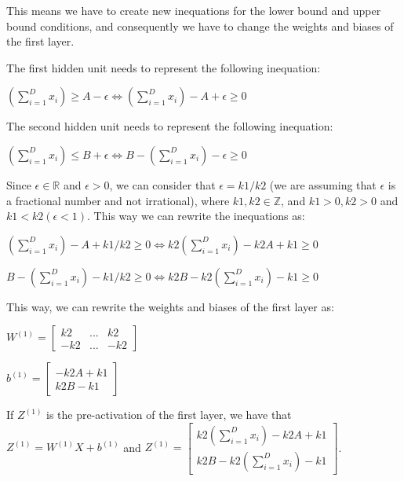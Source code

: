 \documentclass{article}
\begin{document}
This means we have to create new inequations for the lower bound and upper bound conditions, 
and consequently we have to change the weights and biases of the first layer.

The first hidden unit needs to represent the following inequation:

\bigskip

$(\sum_{i=1}^{D} x_i) \geq A - \epsilon \iff (\sum_{i=1}^{D} x_i) - A + \epsilon \geq 0$

\bigskip

The second hidden unit needs to represent the following inequation:

\bigskip

$(\sum_{i=1}^{D} x_i) \leq B + \epsilon \iff B - (\sum_{i=1}^{D} x_i) - \epsilon \geq 0$

\bigskip

Since $\epsilon \in \mathbb{R}$ and $\epsilon > 0$, we can consider that $\epsilon = k1/k2$ (we are assuming that $\epsilon$
is a fractional number and not irrational), where $k1, k2 \in \mathbb{Z}$, 
and $k1 > 0, k2 > 0$ and $k1 < k2 (\epsilon < 1)$. This way we can rewrite the inequations as:

\bigskip

$(\sum_{i=1}^{D} x_i) - A + k1/k2 \geq 0 \iff k2(\sum_{i=1}^{D} x_i) - k2A + k1 \geq 0$

\bigskip

$B - (\sum_{i=1}^{D} x_i) - k1/k2 \geq 0 \iff k2B - k2(\sum_{i=1}^{D} x_i) - k1 \geq 0$

\bigskip

This way, we can rewrite the weights and biases of the first layer as:

\bigskip

\( W^{(1)} = \begin{bmatrix}
    k2  & ... & k2  \\
    -k2 & ... & -k2
\end{bmatrix}
\)

\medskip

\(b^{(1)} = \begin{bmatrix}
    -k2A + k1 \\
    k2B - k1
\end{bmatrix}
\)

\bigskip

If $Z^{(1)}$ is the pre-activation of the first layer, we have that $Z^{(1)} = W^{(1)}X + b^{(1)}$ and
$Z^{(1)} = \begin{bmatrix}
    k2(\sum_{i=1}^{D} x_i) - k2A + k1\\
    k2B - k2(\sum_{i=1}^{D} x_i) - k1
\end{bmatrix}
$.
\end{document}
